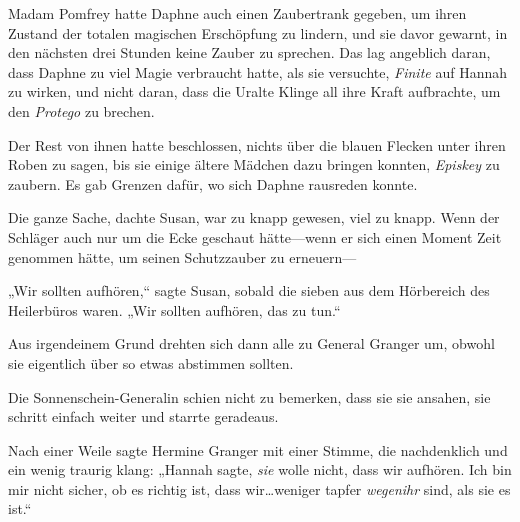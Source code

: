 Madam Pomfrey hatte Daphne auch einen Zaubertrank gegeben, um ihren Zustand der totalen magischen Erschöpfung zu lindern, und sie davor gewarnt, in den nächsten drei Stunden keine Zauber zu sprechen. Das lag angeblich daran, dass Daphne zu viel Magie verbraucht hatte, als sie versuchte, \emph{Finite} auf Hannah zu wirken, und nicht daran, dass die Uralte Klinge all ihre Kraft aufbrachte, um den \emph{Protego} zu brechen.

Der Rest von ihnen hatte beschlossen, nichts über die blauen Flecken unter ihren Roben zu sagen, bis sie einige ältere Mädchen dazu bringen konnten, \emph{Episkey} zu zaubern. Es gab Grenzen dafür, wo sich Daphne rausreden konnte.

Die ganze Sache, dachte Susan, war zu knapp gewesen, viel zu knapp. Wenn der Schläger auch nur um die Ecke geschaut hätte—wenn er sich einen Moment Zeit genommen hätte, um seinen Schutzzauber zu erneuern—

„Wir sollten aufhören,“ sagte Susan, sobald die sieben aus dem Hörbereich des Heilerbüros waren. „Wir sollten aufhören, das zu tun.“

Aus irgendeinem Grund drehten sich dann alle zu General Granger um, obwohl sie eigentlich über so etwas abstimmen sollten.

Die Sonnenschein-Generalin schien nicht zu bemerken, dass sie sie ansahen, sie schritt einfach weiter und starrte geradeaus.

Nach einer Weile sagte Hermine Granger mit einer Stimme, die nachdenklich und ein wenig traurig klang: „Hannah sagte, \emph{sie} wolle nicht, dass wir aufhören. Ich bin mir nicht sicher, ob es richtig ist, dass wir…weniger tapfer \emph{wegenihr} sind, als sie es ist.“

